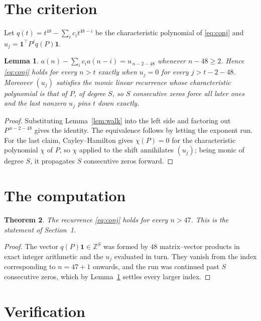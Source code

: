 \documentclass[11pt,a4paper]{article}
\theoremstyle{plain}
\newtheorem{theorem}{Theorem}
\newtheorem{lemma}[theorem]{Lemma}
\theoremstyle{definition}
\begin{document}
\section{The criterion}

Let $q(t)=t^{48}-\sum_i c_i t^{48-i}$ be the characteristic polynomial of
\eqref{eq:conj} and $u_j=\mathbf{1}^{\!\top}P^{j}q(P)\mathbf{1}$.

\begin{lemma}\label{lem:crit}
$a(n)-\sum_i c_i a(n-i)=u_{\,n-2-48}$ whenever $n-48\ge2$. Hence
\eqref{eq:conj} holds for every $n>t$ exactly when $u_j=0$ for every
$j>t-2-48$. Moreover $(u_j)$ satisfies the monic linear recurrence whose
characteristic polynomial is that of $P$, of degree $S$, so $S$ consecutive zeros force all
later ones and the last nonzero $u_j$ pins $t$ down exactly.
\end{lemma}

\begin{proof}
Substituting Lemma~\ref{lem:walk} into the left side and factoring out
$P^{\,n-2-48}$ gives the identity. The equivalence follows by letting the exponent
run. For the last claim, Cayley--Hamilton gives $\chi(P)=0$ for the characteristic
polynomial $\chi$ of $P$, so $\chi$ applied to the shift annihilates $(u_j)$; being monic of
degree $S$, it propagates $S$ consecutive zeros forward.
\end{proof}

\section{The computation}

\begin{theorem}
The recurrence \eqref{eq:conj} holds for every $n>47$. This is the statement of
Section~1.
\end{theorem}

\begin{proof}
The vector $q(P)\mathbf{1}\in\mathbb{Z}^{S}$ was formed by $48$ matrix--vector
products in exact integer arithmetic and the $u_j$ evaluated in turn. They vanish from the
index corresponding to $n=47+1$ onwards, and the run was continued past $S$ consecutive
zeros, which by Lemma~\ref{lem:crit} settles every larger index.
\end{proof}

\section{Verification}
\end{document}
